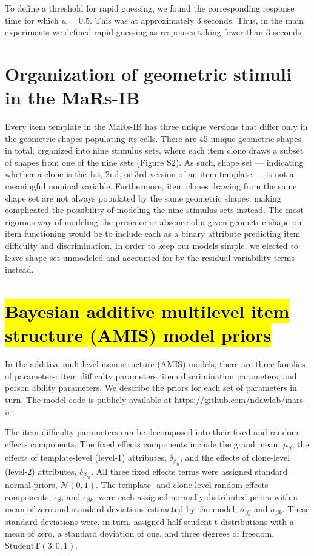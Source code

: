 \documentclass[a4paper,man,natbib]{apa6}
\begin{document}
To define a threshold for rapid guessing, we found the corresponding response time for which $w = 0.5$. This was at approximately 3 seconds. Thus, in the main experiments we defined rapid guessing as responses taking fewer than 3 seconds. 

\section{Organization of geometric stimuli in the MaRs-IB}

Every item template in the MaRs-IB has three unique versions that differ only in the geometric shapes populating its cells. There are 45 unique geometric shapes in total, organized into nine stimulus sets, where each item clone draws a subset of shapes from one of the nine sets (Figure S2). As such, shape set --- indicating whether a clone is the 1st, 2nd, or 3rd version of an item template --- is not a meaningful nominal variable. Furthermore, item clones drawing from the same shape set are not always populated by the same geometric shapes, making complicated the possibility of modeling the nine stimulus sets instead. The most rigorous way of modeling the presence or absence of a given geometric shape on item functioning would be to include each as a binary attribute predicting item difficulty and discrimination. In order to keep our models simple, we elected to leave shape set unmodeled and accounted for by the residual variability terms instead. 

\section{\texorpdfstring{\hl{Bayesian additive multilevel item structure (AMIS) model priors}}{}}

In the additive multilevel item structure (AMIS) models, there are three families of parameters: item difficulty parameters, item discrimination parameters, and person ability parameters. We describe the priors for each set of parameters in turn. The model code is publicly available at \url{https://github.com/ndawlab/mars-irt}.

The item difficulty parameters can be decomposed into their fixed and random effects components. The fixed effects components include the grand mean, $\mu_\beta$, the effects of template-level (level-1) attributes, $\delta_{\beta_n}$, and the effects of clone-level (level-2) attributes, $\delta_{\beta_m}$. All three fixed effects terms were assigned standard normal priors, $\mathcal{N}(0,1)$. The template- and clone-level random effects components, $\epsilon_{\beta j}$ and $\epsilon_{\beta k}$, were each assigned normally distributed priors with a mean of zero and standard deviations estimated by the model, $\sigma_{\beta j}$ and $\sigma_{\beta k}$. These standard deviations were, in turn, assigned half-student-t distributions with a mean of zero, a standard deviation of one, and three degrees of freedom, $\text{StudentT}(3, 0, 1)$.
\end{document}
